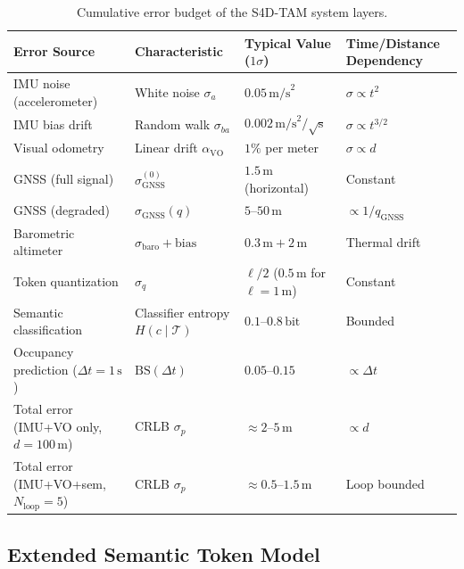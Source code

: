 \begin{table}[htbp]
  \centering
  \caption{Cumulative error budget of the S4D-TAM system layers.}
  \label{tab:error_budget}
  \begin{tabular}{llll}
    \toprule
    \textbf{Error Source} & \textbf{Characteristic} & \textbf{Typical Value ($1\sigma$)} & \textbf{Time/Distance Dependency} \\
    \midrule
    IMU noise (accelerometer) & White noise $\sigma_a$ & $0.05\,\text{m/s}^2$ & $\sigma \propto t^2$ \\
    IMU bias drift & Random walk $\sigma_{ba}$ & $0.002\,\text{m/s}^2/\sqrt{\text{s}}$ & $\sigma \propto t^{3/2}$ \\
    Visual odometry & Linear drift $\alpha_{\text{VO}}$ & $1\%$ per meter & $\sigma \propto d$ \\
    GNSS (full signal) & $\sigma_{\text{GNSS}}^{(0)}$ & $1.5\,\text{m}$ (horizontal) & Constant \\
    GNSS (degraded) & $\sigma_{\text{GNSS}}(q)$ & $5$--$50\,\text{m}$ & $\propto 1/q_{\text{GNSS}}$ \\
    Barometric altimeter & $\sigma_{\text{baro}} + \text{bias}$ & $0.3\,\text{m} + 2\,\text{m}$ & Thermal drift \\
    Token quantization & $\sigma_q$ & $\ell/2$ ($0.5\,\text{m}$ for $\ell=1\,\text{m}$) & Constant \\
    Semantic classification & Classifier entropy $H(c \mid \mathcal{T})$ & $0.1$--$0.8\,\text{bit}$ & Bounded \\
    Occupancy prediction ($\Delta t = 1\,\text{s}$) & $\mathrm{BS}(\Delta t)$ & $0.05$--$0.15$ & $\propto \Delta t$ \\
    Total error (IMU+VO only, $d=100\,\text{m}$) & CRLB $\sigma_p$ & $\approx 2$--$5\,\text{m}$ & $\propto d$ \\
    Total error (IMU+VO+sem, $N_{\text{loop}}=5$) & CRLB $\sigma_p$ & $\approx 0.5$--$1.5\,\text{m}$ & Loop bounded \\
    \bottomrule
  \end{tabular}
\end{table}

\subsection{Extended Semantic Token Model}
\label{subsec:extended_token}

